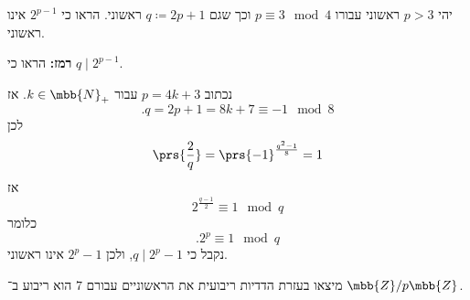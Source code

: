 \documentclass[a4paper,10pt,twoside,openany]{book}
\begin{document}
\begin{exercisechap}
יהי
$p > 3$
ראשוני עבורו
$p \equiv 3 \mod{4}$
וכך שגם
$q \coloneqq 2p + 1$
ראשוני.
הראו כי
$2^{p-1}$
אינו ראשוני.

\textbf{רמז:}
הראו כי
$q \mid 2^{p-1}$.
\end{exercisechap}

\begin{solution}
נכתוב
$p = 4k + 3$
עבור
$k \in \mbb{N}_+$.
אז
\[\text{.} q = 2p+1 = 8k + 7 \equiv -1 \mod{8}\]
לכן
\[\prs{\frac{2}{q}} = \prs{-1}^{\frac{q^2 - 1}{8}} = 1\]
אז
\[2^{\frac{q-1}{2}} \equiv 1 \mod{q}\]
כלומר
\[\text{.} 2^p \equiv 1 \mod{q}\]
נקבל כי
$q \mid 2^p - 1$,
ולכן
$2^p - 1$
אינו ראשוני.
\end{solution}

\begin{exercisechap}
מיצאו בעזרת הדדיות ריבועית את הראשוניים עבורם $7$ הוא ריבוע ב־%
$\mbb{Z} / p \mbb{Z}$.
\end{exercisechap}
\end{document}
